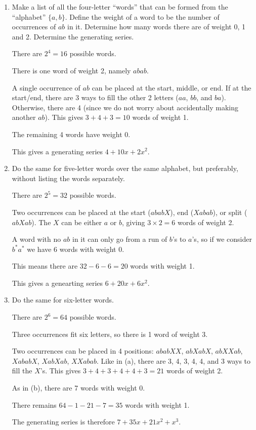 \documentclass[class=math239,notes,tikz]{agony}
\begin{document}
\begin{xca}\end{xca}
\begin{enumerate}
  \item Make a list of all the four-letter ``words''
        that can be formed from the ``alphabet'' $\{a, b\}$.
        Define the weight of a word to be the number of occurrences of $ab$ in it.
        Determine how many words there are of weight 0, 1 and 2.
        Determine the generating series.
        \begin{sol}
          There are $2^4 = 16$ possible words.

          There is one word of weight 2, namely $abab$.

          A single occurrence of $ab$ can be placed at the start, middle, or end.
          If at the start/end, there are 3 ways to fill the other 2 letters ($aa$, $bb$, and $ba$).
          Otherwise, there are 4 (since we do not worry about accidentally making another $ab$).
          This gives $3+4+3 = 10$ words of weight 1.

          The remaining 4 words have weight 0.

          This gives a generating series $4 + 10x + 2x^2$.
        \end{sol}
  \item Do the same for five-letter words over the same alphabet, but preferably,
        without listing the words separately.
        \begin{sol}
          There are $2^5 = 32$ possible words.

          Two occurrences can be placed at the start ($ababX$), end ($Xabab$), or split ($abXab$).
          The $X$ can be either $a$ or $b$, giving $3 \times 2 = 6$ words of weight 2.

          A word with no $ab$ in it can only go from a run of $b$'s to $a$'s,
          so if we consider $b^* a^*$ we have 6 words with weight 0.

          This means there are $32 - 6 - 6 = 20$ words with weight 1.

          This gives a genearting series $6 + 20x + 6x^2$.
        \end{sol}
  \item Do the same for six-letter words.
        \begin{sol}
          There are $2^6 = 64$ possible words.

          Three occurrences fit six letters, so there is 1 word of weight 3.

          Two occurrences can be placed in 4 positions:
          $ababXX$, $abXabX$, $abXXab$, $XababX$, $XabXab$, $XXabab$.
          Like in (a), there are 3, 4, 3, 4, 4, and 3 ways to fill the $X$'s.
          This gives $3 + 4 + 3 + 4 + 4 + 3 = 21$ words of weight 2.

          As in (b), there are 7 words with weight 0.

          There remains $64 - 1 - 21 - 7 = 35$ words with weight 1.

          The generating series is therefore $7 + 35x + 21x^2 + x^3$.
        \end{sol}
\end{enumerate}
\end{document}
